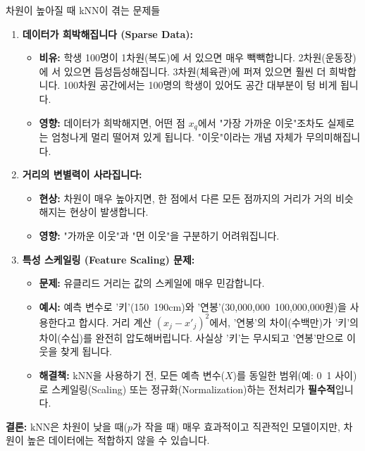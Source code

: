 \documentclass[11pt,a4paper]{book}
\theoremstyle{definition}
\begin{document}
\begin{cautionbox}{차원이 높아질 때 kNN이 겪는 문제들}
\begin{enumerate}
    \item \textbf{데이터가 희박해집니다 (Sparse Data):}
        \begin{itemize}
            \item \textbf{비유:} 학생 100명이 1차원(복도)에 서 있으면 매우 빽빽합니다. 2차원(운동장)에 서 있으면 듬성듬성해집니다. 3차원(체육관)에 퍼져 있으면 훨씬 더 희박합니다. 100차원 공간에서는 100명의 학생이 있어도 공간 대부분이 텅 비게 됩니다.
            \item \textbf{영향:} 데이터가 희박해지면, 어떤 점 $x_q$에서 "가장 가까운 이웃"조차도 실제로는 엄청나게 멀리 떨어져 있게 됩니다. "이웃"이라는 개념 자체가 무의미해집니다.
        \end{itemize}
    \item \textbf{거리의 변별력이 사라집니다:}
        \begin{itemize}
            \item \textbf{현상:} 차원이 매우 높아지면, 한 점에서 다른 모든 점까지의 거리가 거의 비슷해지는 현상이 발생합니다.
            \item \textbf{영향:} "가까운 이웃"과 "먼 이웃"을 구분하기 어려워집니다.
        \end{itemize}
    \item \textbf{특성 스케일링 (Feature Scaling) 문제:}
        \begin{itemize}
            \item \textbf{문제:} 유클리드 거리는 값의 스케일에 매우 민감합니다.
            \item \textbf{예시:} 예측 변수로 '키'(150~190cm)와 '연봉'(30,000,000~100,000,000원)을 사용한다고 합시다. 거리 계산 $(x_j - x'_j)^2$에서, '연봉'의 차이(수백만)가 '키'의 차이(수십)를 완전히 압도해버립니다. 사실상 '키'는 무시되고 '연봉'만으로 이웃을 찾게 됩니다.
            \item \textbf{해결책:} kNN을 사용하기 전, 모든 예측 변수($X$)를 동일한 범위(예: 0~1 사이)로 스케일링(Scaling) 또는 정규화(Normalization)하는 전처리가 \textbf{필수적}입니다.
        \end{itemize}
\end{enumerate}
\end{cautionbox}

\textbf{결론:} kNN은 차원이 낮을 때($p$가 작을 때) 매우 효과적이고 직관적인 모델이지만, 차원이 높은 데이터에는 적합하지 않을 수 있습니다.
\end{document}
